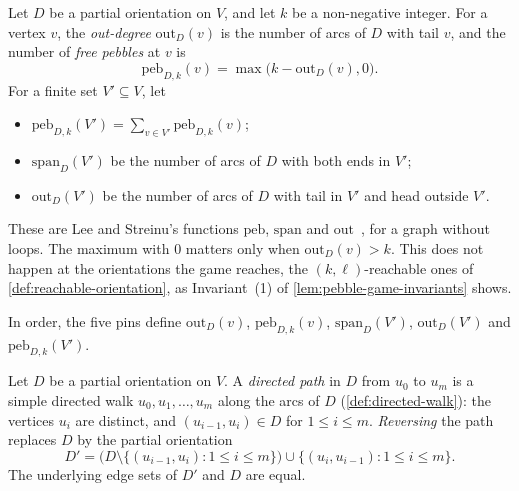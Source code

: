 \begin{definition}
  \label{def:pebble-counts}
  \leanok
  Let $D$ be a partial orientation on $V$, and let $k$ be a
  non-negative integer. For a vertex $v$, the \emph{out-degree}
  $\mathrm{out}_D(v)$ is the number of arcs of $D$ with tail $v$, and
  the number of \emph{free pebbles} at $v$ is
  \[
    \mathrm{peb}_{D,k}(v) = \max\bigl(k - \mathrm{out}_D(v), 0\bigr).
  \]
  For a finite set $V' \subseteq V$, let
  \begin{itemize}
    \item $\mathrm{peb}_{D,k}(V') = \sum_{v \in V'}
      \mathrm{peb}_{D,k}(v)$;
    \item $\mathrm{span}_D(V')$ be the number of arcs of $D$ with both
      ends in $V'$;
    \item $\mathrm{out}_D(V')$ be the number of arcs of $D$ with tail in
      $V'$ and head outside $V'$.
  \end{itemize}
\end{definition}

These are Lee and Streinu's functions $\mathrm{peb}$, $\mathrm{span}$
and $\mathrm{out}$~\cite[\S 4]{leeStreinu2008}, for a graph without
loops. The maximum with $0$ matters only when $\mathrm{out}_D(v) > k$.
This does not happen at the orientations the game reaches, the
$(k, \ell)$-reachable ones of \cref{def:reachable-orientation}, as
Invariant~(1) of \cref{lem:pebble-game-invariants} shows.

\begin{fmlnote}
  In order, the five pins define $\mathrm{out}_D(v)$,
  $\mathrm{peb}_{D,k}(v)$, $\mathrm{span}_D(V')$, $\mathrm{out}_D(V')$
  and $\mathrm{peb}_{D,k}(V')$.
\end{fmlnote}

\begin{definition}
  \label{def:path-reversal}
  \leanok
  Let $D$ be a partial orientation on $V$. A \emph{directed path} in
  $D$ from $u_0$ to $u_m$ is a simple directed walk
  $u_0, u_1, \ldots, u_m$ along the arcs of $D$
  (\cref{def:directed-walk}): the vertices $u_i$ are distinct, and
  $(u_{i-1}, u_i) \in D$ for $1 \le i \le m$. \emph{Reversing} the
  path replaces $D$ by the partial orientation
  \[
    D' = \bigl(D \setminus \{(u_{i-1}, u_i) : 1 \le i \le m\}\bigr)
      \cup \{(u_i, u_{i-1}) : 1 \le i \le m\}.
  \]
  The underlying edge sets of $D'$ and $D$ are equal.
\end{definition}

